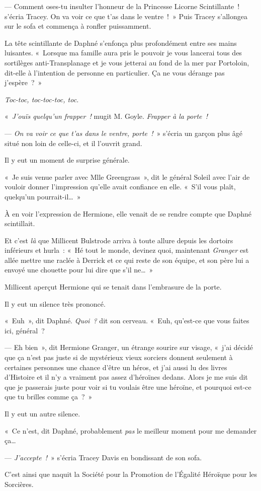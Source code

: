 --- Comment oses-tu insulter l'honneur de la Princesse Licorne Scintillante~! s'écria Tracey.
On va voir ce que t'as dans le ventre~!~»
Puis Tracey s'allongea sur le sofa et commença à ronfler puissamment.

La tête scintillante de Daphné s'enfonça plus profondément entre ses mains luisantes.
«~Lorsque ma famille aura pris le pouvoir je vous lancerai tous des sortilèges anti-Transplanage et je vous jetterai au fond de la mer par Portoloin, dit-elle à l'intention de personne en particulier.
Ça ne vous dérange pas j'espère~?~»

\emph{Toc-toc, toc-toc-toc, toc.}

«~\emph{J'ouïs quelqu'un frapper~!} mugit M. Goyle.
\emph{Frapper à la porte~!}

--- \emph{On va voir ce que t'as dans le ventre, porte~!}~» s'écria un garçon plus âgé situé non loin de celle-ci, et il l'ouvrit grand.

Il y eut un moment de surprise générale.

«~Je suis venue parler avec Mlle Greengrass~», dit le général Soleil avec l'air de vouloir donner l'impression qu'elle avait confiance en elle.
«~S'il vous plaît, quelqu'un pourrait-il…~»

À en voir l'expression de Hermione, elle venait de se rendre compte que Daphné scintillait.

Et c'est \emph{là} que Millicent Bulstrode arriva à toute allure depuis les dortoirs inférieurs et hurla~: «~Hé tout le monde, devinez quoi, maintenant \emph{Granger} est allée mettre une raclée à Derrick et ce qui reste de son équipe, et son père lui a envoyé une chouette pour lui dire que s'il ne…~»

Millicent aperçut Hermione qui se tenait dans l'embrasure de la porte.

Il y eut un silence très prononcé.

«~Euh~», dit Daphné.
\emph{Quoi~?} dit son cerveau.
«~Euh, qu'est-ce que vous faites ici, général~?

--- Eh bien~», dit Hermione Granger, un étrange sourire sur visage, «~j'ai décidé que ça n'est pas juste si de mystérieux vieux sorciers donnent seulement à certaines personnes une chance d'être un héros, et j'ai aussi lu des livres d'Histoire et il n'y a vraiment pas assez d'héroïnes dedans.
Alors je me suis dit que je passerais juste pour voir si tu voulais être une héroïne, et pourquoi est-ce que tu brilles comme ça~?~»

Il y eut un autre silence.

«~Ce n'est, dit Daphné, probablement \emph{pas} le meilleur moment pour me demander ça…

--- \emph{J'accepte~!}~» s'écria Tracey Davis en bondissant de son sofa.

\later

C'est ainsi que naquit la Société pour la Promotion de l'Égalité Héroïque pour les Sorcières.
